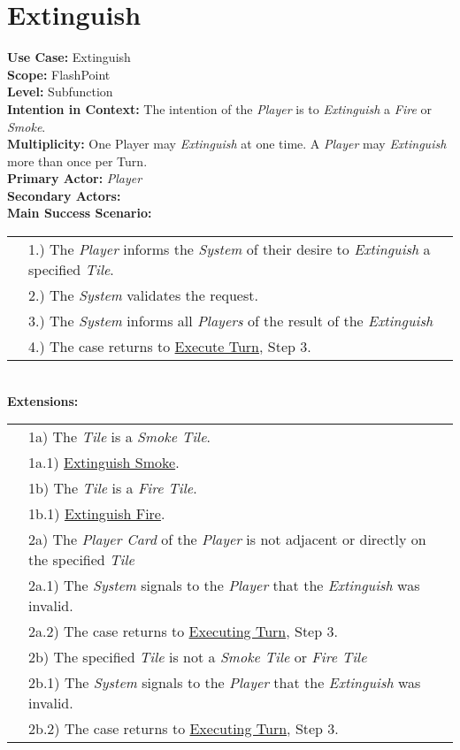 \documentclass{article}
\begin{document}
	\section*{Extinguish}
	\textbf{Use Case:} Extinguish\\
	\textbf{Scope:} FlashPoint\\
	\textbf{Level:} Subfunction\\
	\textbf{Intention in Context: } The intention of the \textit{Player} is to \textit{Extinguish} a \textit{Fire} or \textit{Smoke}. \\
	\textbf{Multiplicity: } One Player may \textit{Extinguish} at one time. A \textit{Player} may \textit{Extinguish} more than once per Turn.\\
	\textbf{Primary Actor:} \textit{Player} \\
	\textbf{Secondary Actors:}\\
	\textbf{Main Success Scenario:}\\
	\begin{tabular}{l l}
		&1.) The \textit{Player} informs the \textit{System} of their desire to \textit{Extinguish} a specified \textit{Tile}.\\
		&2.) The \textit{System} validates the request. \\
		&3.) The \textit{System} informs all \textit{Players} of the result of the \textit{Extinguish}\\
		&4.) The case returns to \underline{Execute Turn}, Step 3.\\
	\end{tabular}\\
	\textbf{Extensions: }\\
	\begin{tabular}{l l}
		&1a) The \textit{Tile} is a \textit{Smoke Tile}.\\
		&\qquad1a.1) \underline{Extinguish Smoke}.\\
		&1b) The \textit{Tile} is a \textit{Fire Tile}. \\
		&\qquad1b.1) \underline{Extinguish Fire}.\\
		&2a) The \textit{Player Card} of the \textit{Player} is not adjacent or directly on the specified \textit{Tile} \\
		&\qquad2a.1) The \textit{System} signals to the \textit{Player} that the \textit{Extinguish} was invalid.\\ 
		&\qquad2a.2) The case returns to \underline{Executing Turn}, Step 3.\\
		&2b) The specified \textit{Tile} is not a \textit{Smoke Tile} or \textit{Fire Tile}\\
		&\qquad2b.1) The \textit{System} signals to the \textit{Player} that the \textit{Extinguish} was invalid.\\ 
		&\qquad2b.2) The case returns to \underline{Executing Turn}, Step 3.\\
	\end{tabular}
	
\end{document}
